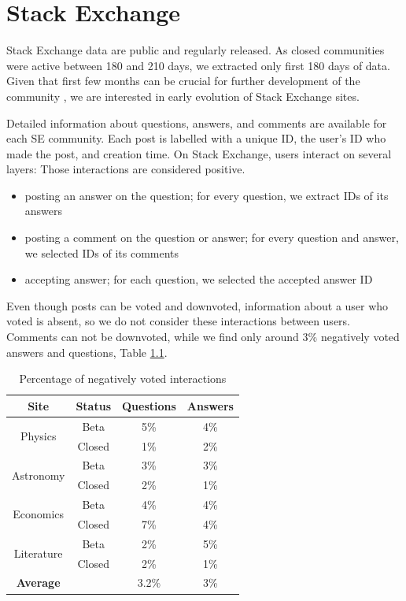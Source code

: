 \chapter{Stack Exchange}
\label{App:SE}
Stack Exchange data are public and regularly released. As closed communities were active between 180 and 210 days, we extracted only first 180 days of data. Given that first few months can be crucial for further development of the community \cite{dover2020sustainable}, we are interested in early evolution of Stack Exchange sites. 

Detailed information about questions, answers, and comments are available for each SE community. Each post is labelled with a unique ID, the user's ID who made the post, and creation time. On Stack Exchange, users interact on several layers: Those interactions are considered positive.
\begin{itemize}
	\item posting an answer on the question; for every question, we extract IDs of its answers
	\item posting a comment on the question or answer; for every question and answer, we selected IDs of its comments
	\item accepting answer; for each question, we selected the accepted answer ID
\end{itemize}

Even though posts can be voted and downvoted, information about a user who voted is absent, so we do not consider these interactions between users. Comments can not be downvoted, while we find only around 3\% negatively voted answers and questions, Table \ref{tab:negint}.

\begin{table}[hbt!]
	\centering
	\caption{Percentage of negatively voted interactions}
	\label{tab:negint}
	\begin{tabular}{cc|cc}
		
		\hline
		Site                        & Status & Questions & Answers \\ \hline
		\multirow{2}{*}{Physics}    & Beta   & 5\%       & 4\%     \\
		& Closed & 1\%       & 2\%     \\ \hline
		\multirow{2}{*}{Astronomy}  & Beta   & 3\%       & 3\%     \\
		& Closed & 2\%       & 1\%     \\ \hline
		\multirow{2}{*}{Economics}  & Beta   & 4\%       & 4\%     \\
		& Closed & 7\%       & 4\%     \\ \hline
		\multirow{2}{*}{Literature} & Beta   & 2\%       & 5\%     \\ 
		& Closed & 2\%       & 1\%     \\ \hline \hline
		\textbf{Average}            &        & 3.2\%     & 3\%     \\ \hline 
	\end{tabular}
\end{table}


